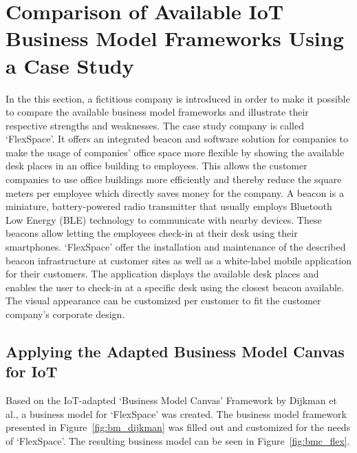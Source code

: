 \section{Comparison of Available IoT Business Model Frameworks Using a Case Study}
\label{sec:bmf_comparison}
\vspace{-1em}
	In the this section, a fictitious company is introduced in order to make it possible to compare the available business model frameworks and illustrate their respective strengths and weaknesses.
	The case study company is called `FlexSpace'. It offers an integrated beacon and software solution for companies to make the usage of companies' office space more flexible by showing the available desk places in an office building to employees. This allows the customer companies to use office buildings more efficiently and thereby reduce the square meters per employee which directly saves money for the company. A beacon is a miniature, battery-powered radio transmitter that usually employs  Bluetooth Low Energy (BLE) technology to communicate with nearby devices. These beacons allow letting the employees check-in at their desk using their smartphones. `FlexSpace' offer the installation and maintenance of the described beacon infrastructure at customer sites as well as a white-label mobile application for their customers. The application displays the available desk places and enables the user to check-in at a specific desk using the closest beacon available. The visual appearance can be customized per customer to fit the customer company's corporate design.
	\vspace{-1em}
	\subsection{Applying the Adapted Business Model Canvas for IoT}
	\vspace{-1em}
		Based on the IoT-adapted `Business Model Canvas' Framework by Dijkman et al., a business model for `FlexSpace' was created. The business model framework presented in Figure~\ref{fig:bm_dijkman} was filled out and customized for the needs of `FlexSpace'. The resulting business model can be seen in Figure~\ref{fig:bmc_flex}.

